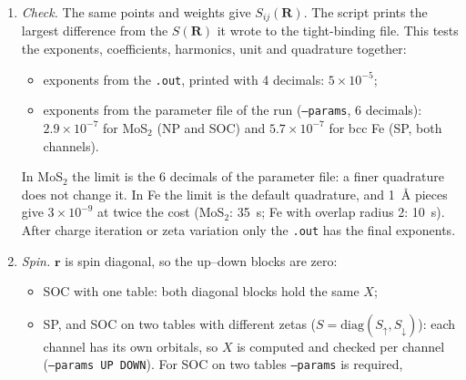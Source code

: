 \documentclass[11pt,a4paper]{article}
\newcommand{\opt}[1]{\texttt{#1}}
\begin{document}
\begin{enumerate}[leftmargin=*]
\begin{itemize}
  \item \emph{Angles:} after multiplying by $\mathbf{r}$, the angular dependence is a
    trigonometric polynomial of degree $\le l_i+l_j+1\le7$. These rules integrate it
    exactly, so only the radial integration is approximate.
  \item \emph{Radius:} Gauss--Legendre with 10 points per piece, on pieces of at most
    2~\AA{}. The pieces are graded near the nuclei (edges at $0.05,0.1,0.2,\ldots$~\AA{}) for
    compact components such as the $\zeta=6.09$~bohr$^{-1}$ of Fe~$3d$.
  \item \emph{Kinks:} the $r_a$ pieces are split at $r_a=d$ and $r_a=R_c(B)-d$, where the
    limits of the $r_b$ range change form. With 1~\AA{} pieces in bcc Fe, these cuts bring
    the error in $S$ from $5\times10^{-5}$ to $3\times10^{-9}$.
  \end{itemize}
\item \emph{Check.} The same points and weights give $S_{ij}(\mathbf{R})$. The script prints
  the largest difference from the $S(\mathbf{R})$ it wrote to the tight-binding file. This
  tests the exponents, coefficients, harmonics, unit and quadrature together:
  \begin{itemize}
  \item exponents from the \texttt{.out}, printed with 4 decimals: $5\times10^{-5}$;
  \item exponents from the parameter file of the run (\opt{--params}, 6 decimals):
    $2.9\times10^{-7}$ for MoS$_2$ (NP and SOC) and $5.7\times10^{-7}$ for bcc Fe (SP, both
    channels).
  \end{itemize}
  In MoS$_2$ the limit is the 6 decimals of the parameter file: a finer quadrature does not
  change it. In Fe the limit is the default quadrature, and 1~\AA{} pieces give
  $3\times10^{-9}$ at twice the cost (MoS$_2$: 35~s; Fe with overlap radius 2: 10~s).
  After charge iteration or zeta variation only the \texttt{.out} has the final exponents.
\item \emph{Spin.} $\mathbf{r}$ is spin diagonal, so the up--down blocks are zero:
  \begin{itemize}
  \item SOC with one table: both diagonal blocks hold the same $X$;
  \item SP, and SOC on two tables with different zetas ($S=\mathrm{diag}(S_\uparrow,
    S_\downarrow)$): each channel has its own orbitals, so $X$ is computed and checked per
    channel (\opt{--params UP DOWN}). For SOC on two tables \opt{--params} is required,

\end{itemize}
\end{enumerate}
\end{document}
